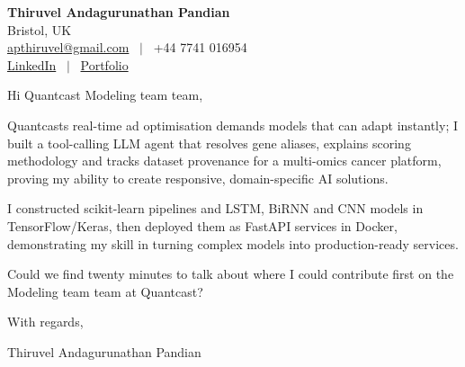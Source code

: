\documentclass[11pt,a4paper]{article}
\begin{document}
\raggedright
\pagestyle{empty}

\begin{center}
    {\LARGE \color{linkblue} \textbf{Thiruvel Andagurunathan Pandian}}\\[0.2cm]
    Bristol, UK \\
    \href{mailto:apthiruvel@gmail.com}{apthiruvel@gmail.com} \ $|$ \ +44 7741 016954 \\
\href{https://www.linkedin.com/in/thiruvel-a-p/}{LinkedIn} \ $|$ \ \href{https://thiruvel-ap.github.io/PersonalPortfolio/}{Portfolio}
\end{center}

\vspace{0.4cm}

\noindent
Hi Quantcast Modeling team team,

Quantcast\textquotesingle{}s real-time ad optimisation demands models that can adapt instantly; I built a tool-calling LLM agent that resolves gene aliases, explains scoring methodology and tracks dataset provenance for a multi-omics cancer platform, proving my ability to create responsive, domain-specific AI solutions.

I constructed scikit-learn pipelines and LSTM, BiRNN and CNN models in TensorFlow/Keras, then deployed them as FastAPI services in Docker, demonstrating my skill in turning complex models into production-ready services.

Could we find twenty minutes to talk about where I could contribute first on the Modeling team team at Quantcast?

\vspace{0.5cm}

With regards,

Thiruvel Andagurunathan Pandian
\end{document}
